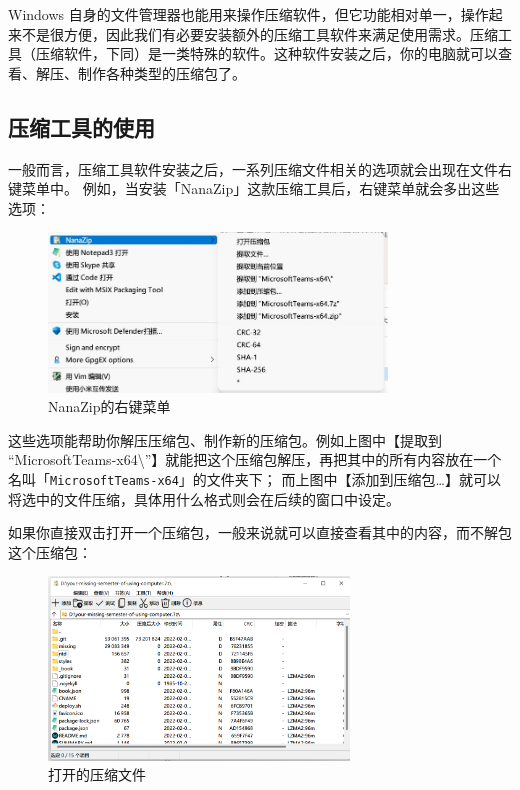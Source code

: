 Windows 自身的文件管理器也能用来操作压缩软件，但它功能相对单一，操作起来不是很方便，因此我们有必要安装额外的压缩工具软件来满足使用需求。压缩工具（压缩软件，下同）是一类特殊的软件。这种软件安装之后，你的电脑就可以查看、解压、制作各种类型的压缩包了。

\subsection{压缩工具的使用}

一般而言，压缩工具软件安装之后，一系列压缩文件相关的选项就会出现在文件右键菜单中。
例如，当安装「NanaZip」这款压缩工具后，右键菜单就会多出这些选项：

\begin{figure}[htb!]
  \centering
  \includegraphics[width=9cm]{assets/Nanazip_Right_Click.jpg}
  \caption{NanaZip的右键菜单}
  \label{Nanazip_Right_Click}
\end{figure}

这些选项能帮助你解压压缩包、制作新的压缩包。例如上图中【提取到 “MicrosoftTeams-x64\textbackslash ”】就能把这个压缩包解压，再把其中的所有内容放在一个名叫「\verb|MicrosoftTeams-x64|」的文件夹下；
而上图中【添加到压缩包…】就可以将选中的文件压缩，具体用什么格式则会在后续的窗口中设定。

如果你直接双击打开一个压缩包，一般来说就可以直接查看其中的内容，而不解包这个压缩包：

\begin{figure}[htb!]
  \centering
  \includegraphics[width=8cm]{assets/Nanazip_View.png}
  \caption{打开的压缩文件}
  \label{Nanazip_View}
\end{figure}

